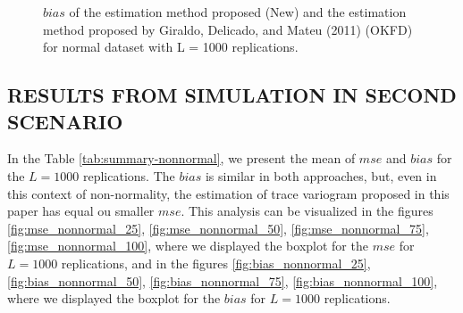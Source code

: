 \documentclass[12pt,]{article}
\theoremstyle{definition}
\theoremstyle{definition}
\theoremstyle{definition}
\theoremstyle{remark}
\begin{document}
\begin{figure}[htbp]
  \caption{$bias$ of the estimation method proposed (New) and the estimation method proposed by Giraldo, Delicado, and Mateu (2011) (OKFD) for normal dataset with L = 1000 replications.}
\end{figure}

\hypertarget{results-from-simulation-in-second-scenario}{%
\subsection*{RESULTS FROM SIMULATION IN SECOND SCENARIO}\label{results-from-simulation-in-second-scenario}}

In the Table \ref{tab:summary-nonnormal}, we present the mean of \(mse\) and \(bias\) for the \(L=1000\) replications. The \(bias\) is similar in both approaches, but, even in this context of non-normality, the estimation of trace variogram proposed in this paper has equal ou smaller \(mse\).
This analysis can be visualized in the figures \ref{fig:mse_nonnormal_25}, \ref{fig:mse_nonnormal_50}, \ref{fig:mse_nonnormal_75}, \ref{fig:mse_nonnormal_100}, where we displayed the boxplot for the \(mse\) for \(L=1000\) replications, and in the figures \ref{fig:bias_nonnormal_25}, \ref{fig:bias_nonnormal_50}, \ref{fig:bias_nonnormal_75}, \ref{fig:bias_nonnormal_100}, where we displayed the boxplot for the \(bias\) for \(L=1000\) replications.
\end{document}
